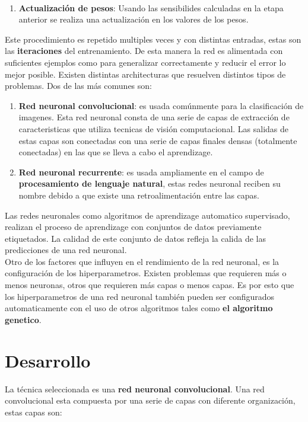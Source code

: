 \documentclass{article}
\begin{document}
$$\begin{enumerate}
    \item \textbf{Actualización de pesos}: Usando las sensibilides calculadas en la etapa anterior se realiza una actualización en los valores de los pesos. 
\end{enumerate}
Este procedimiento es repetido multiples veces y con distintas entradas, estas son las \textbf{iteraciones} del entrenamiento. De esta manera la red es alimentada con suficientes ejemplos como para generalizar correctamente y reducir el error lo mejor posible.
Existen distintas architecturas que resuelven distintos tipos de problemas. Dos de las más comunes son:
\begin{enumerate}
    \item \textbf{Red neuronal convolucional}: es usada comúnmente para la clasificación de imagenes. Esta red neuronal consta de una serie de capas de extracción de caracteristicas que utiliza tecnicas de visión computacional. Las salidas de estas capas son conectadas con una serie de capas finales densas (totalmente conectadas) en las que se lleva a cabo el aprendizage.
    \item \textbf{Red neuronal recurrente}: es usada ampliamente en el campo de \textbf{procesamiento de lenguaje natural}, estas redes neuronal reciben su nombre debido a que existe una retroalimentación entre las capas.
\end{enumerate} 
Las redes neuronales como algoritmos de aprendizage automatico supervisado, realizan el proceso de aprendizage con conjuntos de datos previamente etiquetados. La calidad de este conjunto de datos refleja la calida de las predicciones de una red neuronal. \\
Otro de los factores que influyen en el rendimiento de la red neuronal, es la configuración de los hiperparametros. Existen problemas que requieren más o menos neuronas, otros que requieren más capas o menos capas. Es por esto que los hiperparametros de una red neuronal también pueden ser configurados automaticamente con el uso de otros algoritmos tales como \textbf{el algoritmo genetico}.

\section{Desarrollo}\label{sec:Desarrollo}
La técnica seleccionada es una \textbf{red neuronal convolucional}. Una red convolucional esta compuesta por una serie de capas con diferente organización, estas capas son:
\end{document}
